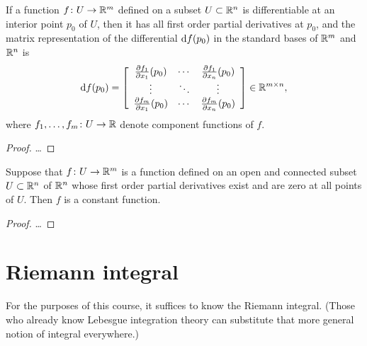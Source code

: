 \begin{lemma}
  \label{lem:jacobian_matrix}
  If a function $f \colon U \to \mathbb{R}^m$
  defined on a subset $U \subset \mathbb{R}^n$ is differentiable
  at an interior point $p_0$ of $U$, then it has
  all first order partial derivatives at $p_0$, and the
  matrix representation of the differential $\mathrm{d} f (p_0)$
  in the standard bases of $\mathbb{R}^m$ and $\mathbb{R}^n$ is
  \begin{align*}
    \mathrm{d} f (p_0)
      = \left[ \begin{array}{ccc}
        \frac{\partial f_1}{\partial x_1}(p_0) & \cdots & \frac{\partial f_1}{\partial x_n}(p_0) \\
        \vdots & \ddots & \vdots \\
        \frac{\partial f_m}{\partial x_1}(p_0) & \cdots & \frac{\partial f_m}{\partial x_n}(p_0)
        \end{array} \right]
      \in \mathbb{R}^{m \times n} ,
  \end{align*}
  where $f_1, \ldots, f_m \colon U \to \mathbb{R}$ denote component functions of $f$.
\end{lemma}
\begin{proof}
  \ldots
\end{proof}

\begin{lemma}
  \label{lem:vanishing_partial_derivatives}
  Suppose that $f \colon U \to \mathbb{R}^m$ is a function
  defined on an open and connected subset $U \subset \mathbb{R}^n$ of $\mathbb{R}^n$
  whose first order partial derivatives exist and are zero at all points
  of $U$. Then $f$ is a constant function.
\end{lemma}
\begin{proof}
  \ldots
\end{proof}


\section{Riemann integral}

For the purposes of this course, it suffices to know the Riemann
integral. (Those who already know Lebesgue integration theory can
substitute that more general notion of integral everywhere.)

